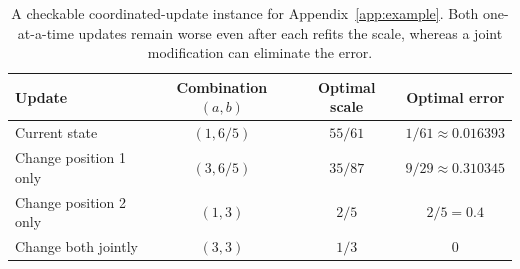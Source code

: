 \begin{table}[t]
\centering
\small
\caption{
A checkable coordinated-update instance for Appendix~\ref{app:example}.
Both one-at-a-time updates remain worse even after each refits the scale, whereas a joint modification can eliminate the error.
}
\label{tab:appendix_example}
\begin{tabular}{lccc}
\toprule
Update & Combination $(a,b)$ & Optimal scale & Optimal error \\
\midrule
Current state & $(1,6/5)$ & $55/61$ & $1/61\approx0.016393$ \\
Change position 1 only & $(3,6/5)$ & $35/87$ & $9/29\approx0.310345$ \\
Change position 2 only & $(1,3)$ & $2/5$ & $2/5=0.4$ \\
Change both jointly & $(3,3)$ & $1/3$ & $0$ \\
\bottomrule
\end{tabular}
\end{table}
